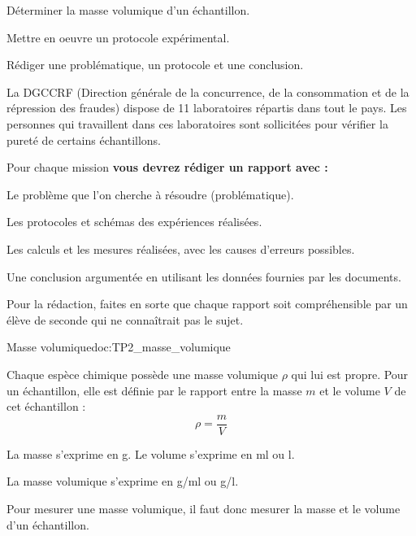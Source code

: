 \teteSndCorp




\begin{objectifs}
  \item Déterminer la masse volumique d'un échantillon.
  \item Mettre en oeuvre un protocole expérimental.
  \item Rédiger une problématique, un protocole et une conclusion.
\end{objectifs}


\begin{contexte}
  La \textsf{DGCCRF} (Direction générale de la concurrence, de la consommation et de la répression des fraudes) dispose de 11 laboratoires répartis dans tout le pays. 
  Les personnes qui travaillent dans ces laboratoires sont sollicitées pour vérifier la pureté de certains échantillons.
\end{contexte}


Pour chaque mission \textbf{vous devrez rédiger un rapport avec :}
\begin{listePoints}
  \item Le problème que l'on cherche à résoudre (problématique).
  \item Les protocoles et schémas des expériences réalisées.
  \item Les calculs et les mesures réalisées, avec les causes d'erreurs possibles.
  \item Une conclusion argumentée en utilisant les données fournies par les documents.
\end{listePoints}

\flecheLongue Pour la rédaction, faites en sorte que chaque rapport soit compréhensible par un élève de seconde qui ne connaîtrait pas le sujet.


\begin{doc}{Masse volumique}{doc:TP2_masse_volumique}
  \begin{importants}
    Chaque espèce chimique possède une masse volumique $\rho$ qui lui est propre.
    Pour un échantillon, elle est définie par le rapport entre la masse $m$ et le volume $V$ de cet échantillon : 
    \begin{equation*}
      \rho = \dfrac{m}{V}
    \end{equation*}
  \end{importants}
  
  \begin{listePoints}
    \item La masse s'exprime en \unit{\g}.
    Le volume s'exprime en \unit{\ml} ou \unit{\litre}.
    \item La masse volumique s'exprime en \unit{\g/\ml} ou \unit{\g/\litre}.
  \end{listePoints}
  Pour mesurer une masse volumique, il faut donc mesurer la masse et le volume d'un échantillon.
\end{doc}


